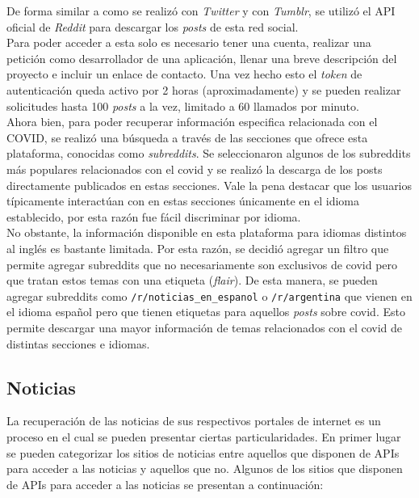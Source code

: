 De forma similar a como se realizó con \textit{Twitter} y con \textit{Tumblr}, se utilizó el API oficial de \textit{Reddit} \cite{RedditDoc} para descargar los \textit{posts} de esta red social. \\

Para poder acceder a esta solo es necesario tener una cuenta, realizar una petición como desarrollador de una aplicación, llenar una breve descripción del proyecto e incluir un enlace de contacto. Una vez hecho esto el \textit{token} de autenticación queda activo por 2 horas (aproximadamente) y se pueden realizar solicitudes hasta 100 \textit{posts} a la vez, limitado a 60 llamados por minuto. \\

Ahora bien, para poder recuperar información especifica relacionada con el COVID, se realizó una búsqueda a través de las secciones que ofrece esta plataforma, conocidas como \textit{subreddits}. Se seleccionaron algunos de los subreddits más populares relacionados con el covid y se realizó la descarga de los posts directamente publicados en estas secciones. Vale la pena destacar que los usuarios típicamente interactúan con en estas secciones únicamente en el idioma establecido, por esta razón fue fácil discriminar por idioma.\\

No obstante, la información disponible en esta plataforma para idiomas distintos al inglés es bastante limitada. Por esta razón, se decidió agregar un filtro que permite agregar subreddits que no necesariamente son exclusivos de covid pero que tratan estos temas con una etiqueta (\textit{flair}). De esta manera, se pueden agregar subreddits como \texttt{/r/noticias\_en\_espanol} o \texttt{/r/argentina} que vienen en el idioma español pero que tienen etiquetas para aquellos \textit{posts} sobre covid. Esto permite descargar una mayor información de temas relacionados con el covid de distintas secciones e idiomas.

\subsection{Noticias}
La recuperación de las noticias de sus respectivos portales de internet es un proceso en el cual se pueden presentar ciertas particularidades. En primer lugar se pueden categorizar los sitios de noticias entre aquellos que disponen de APIs para acceder a las noticias y aquellos que no. Algunos de los sitios que disponen de APIs para acceder a las noticias se presentan a continuación:

